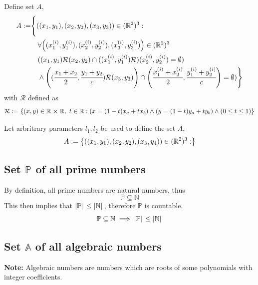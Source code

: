 \documentclass[]{article}
\newcommand{\Rel}{\mathcal{R}}
\newcommand{\R}{\mathbb{R}}
\newcommand{\N}{\mathbb{N}}
\begin{document}
Define set $A$,
\begin{align*}
	A := &\Bigg{\{}
		((x_1,y_1),(x_2,y_2),(x_3,y_3)) \in (\R^2)^3: \\
		&\quad\forall \qty((x_1^{(i)},y_1^{(i)}),(x_2^{(i)},y_2^{(i)}),(x_3^{(i)},y_3^{(i)})) \in (\R^2)^3\\ 
		&\quad ((x_1,y_1)\Rel(x_2,y_2) \cap ((x_1^{(i)},y_1^{(i)})\Rel)(x_2^{(i)},y_2^{(i)}) = \emptyset)\\
		&\quad \land \qty((\cfrac{x_1+x_2}{2},\cfrac{y_1+y_2}{c})\Rel(x_3,y_3)) 
			\cap \qty(\cfrac{x_1^{(i)}+x_2^{(i)}}{2},\cfrac{y_1^{(i)}+y_2^{(i)}}{c}) = \emptyset)
	\Bigg{\}}
\end{align*}
with $\Rel$ defined as
\begin{displaymath}
	\Rel := \qty{
		(x,y) \in \R \cross \R, \ t \in \R : 
		(x = (1-t) x_a + t x_b) \land (y = (1-t) y_a + t y_b)
		\land (0 \leq t \leq 1)
	}
\end{displaymath}


Let arbritrary parameters $l_1, l_2$ be used to define the set $A$,
\begin{displaymath}
	A := \qty{((x_1,y_1),(x_2,y_2),(x_3,y_4)) \in (\R^2)^3 :}
\end{displaymath}













\subsection{Set $\mathbb{P}$ of all prime numbers}
By definition, all prime numbers are natural numbers, thus
\begin{displaymath}
	\mathbb{P} \subseteq \N
\end{displaymath}
This then implies that $\abs*{\mathbb{P}} \leq \abs*{\N}$, therefore $\mathbb{P}$ is countable.
\begin{displaymath}
	\mathbb{P} \subseteq \N \implies \abs*{\mathbb{P}} \leq \abs*{\N}
\end{displaymath}


\subsection{Set $\mathbb{A}$ of all algebraic numbers}
\textbf{Note:} Algebraic numbers are numbers which are roots of 
some polynomials with integer coefficients.
\end{document}
